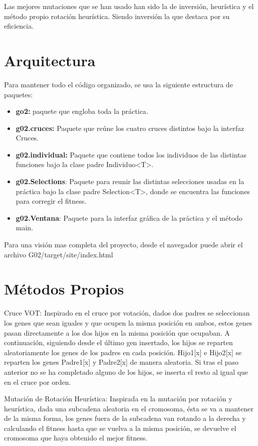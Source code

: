 \documentclass[twoside]{AiTeX}
\begin{document}
Las mejores mutaciones que se han usado han sido la de inversión, heurística y el método propio rotación heurística. Siendo inversión la que destaca por su eficiencia.

\section{Arquitectura}

Para mantener todo el código organizado, se usa la siguiente estructura de paquetes:

\begin{itemize}
    \item\textbf{go2:} paquete que engloba toda la práctica.
    \item\textbf{g02.cruces:} Paquete que reúne los cuatro cruces distintos bajo la interfaz Cruces.
    \item\textbf{g02.individual:} Paquete que contiene todos los individuos de las distintas funciones bajo la clase padre Individuo<T>.
    \item\textbf{g02.Selections}: Paquete para reunir las distintas selecciones usadas en la práctica bajo la clase padre Selection<T>, donde se encuentra las funciones para corregir el fitness.
    \item\textbf{g02.Ventana}: Paquete para la interfaz gráfica de la práctica y el método main.
\end{itemize}

Para una visión mas completa del proyecto, desde el navegador puede abrir el archivo G02/target/site/index.html

\section{Métodos Propios}

Cruce VOT: Inspirado en el cruce por votación, dados dos padres se seleccionan los genes que sean iguales y que ocupen la misma posición en ambos, estos genes pasan directamente a los dos hijos en la misma posición que ocupaban.
A continuación, siguiendo desde el último gen insertado, los hijos se reparten aleatoriamente los genes de los padres en cada posición. Hijo1[x] e Hijo2[x] se reparten los genes Padre1[x] y Padre2[x] de manera aleatoria.
Si tras el paso anterior no se ha completado alguno de los hijos, se inserta el resto al igual que en el cruce por orden.

Mutación de Rotación Heurística: Inspirada en la mutación por rotación y heurística, dada una subcadena aleatoria en el cromosoma, ésta se va a mantener de la misma forma, los genes fuera de la subcadena van rotando a la derecha y calculando el fitness hasta que se vuelva a la misma posición, se devuelve el cromosoma que haya obtenido el mejor fitness.
\end{document}
